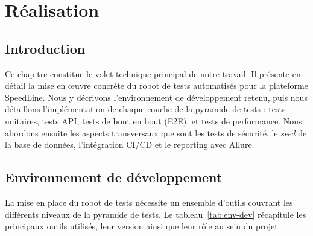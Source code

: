 
\chapter{Réalisation}
\label{chap:realisation}

\section*{Introduction}
Ce chapitre constitue le volet technique principal de notre travail. Il présente en détail
la mise en \oe uvre concrète du robot de tests automatisés pour la plateforme SpeedLine.
Nous y décrivons l'environnement de développement retenu, puis nous détaillons
l'implémentation de chaque couche de la pyramide de tests : tests unitaires, tests API,
tests de bout en bout (E2E), et tests de performance. Nous abordons ensuite les aspects
transversaux que sont les tests de sécurité, le \textit{seed} de la base de données,
l'intégration CI/CD et le reporting avec Allure.

\section{Environnement de développement}
\label{sec:env-dev}

La mise en place du robot de tests nécessite un ensemble d'outils couvrant les différents
niveaux de la pyramide de tests. Le tableau~\ref{tab:env-dev} récapitule les principaux
outils utilisés, leur version ainsi que leur rôle au sein du projet.

